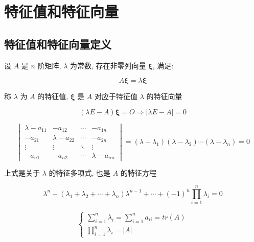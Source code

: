 
\chapter{特征值和特征向量}

\section{特征值和特征向量定义}

\begin{definition}[特征值和特征向量]
	设 $A$ 是 $n$ 阶矩阵, $\lambda$ 为常数, 存在非零列向量 $\boldsymbol{\xi}$, 满足:  
	
	$$A\boldsymbol{\xi} = \lambda\boldsymbol{\xi}$$
	
	称 $\lambda$ 为 $A$ 的特征值, $\boldsymbol{\xi}$ 是 $A$ 对应于特征值 $\lambda$ 的特征向量
\end{definition}

\begin{corollary}[特征值]
	$$(\lambda E-A)\boldsymbol{\xi} = O \Rightarrow |\lambda E - A|=0$$
	
	$$\begin{vmatrix}
		\lambda - a_{11} & -a_{12}          & \cdots & -a_{1n}\\
		-a_{21}          & \lambda - a_{22} & \cdots & -a_{2n}\\
		\vdots           & \vdots           & \ddots & \vdots\\
		-a_{n1}          & -a_{n2}          & \cdots & \lambda - a_{nn}
	\end{vmatrix} = 
	(\lambda-\lambda_{1})(\lambda-\lambda_{2}) \cdots (\lambda-\lambda_{n}) = 0$$
	
	上式是关于 $\lambda$ 的特征多项式, 也是 $A$ 的特征方程  
	
	$$\lambda^{n}-(\lambda_{1}+\lambda_{2}+\cdots+\lambda_{n})\lambda^{n-1}+\cdots+(-1)^{n}\prod\limits_{i=1}^{n}\lambda_{i}=0$$
	  
	$$\begin{cases}
		\sum\limits_{i=1}^{n}\lambda_{i} = \sum\limits_{i=1}^{n}a_{ii} = tr(A)\\
		\prod\limits_{i=1}^{n}\lambda_{i} = |A|
	\end{cases}$$
\end{corollary}

